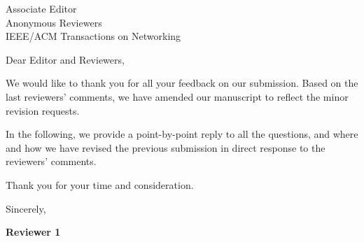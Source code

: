 \documentclass[10pt]{letter}
\date{}
\newcommand{\lettersection}[1]{{\Large {\bfseries #1}}}
\begin{document}

\begin{letter}{Associate Editor\\
Anonymous Reviewers\\
IEEE/ACM Transactions on Networking\\
\vspace{0.2cm}}


\opening{Dear Editor and Reviewers,}
\vspace{0.1cm}


We would like to thank you for all your feedback on our submission. Based on the last reviewers' comments, we have amended our manuscript to reflect the minor revision requests. 

In the following, we provide a point-by-point reply to all the questions, and where and how we have revised the previous submission in direct response to the reviewers’ comments.

Thank you for your time and consideration.

\closing{Sincerely,}

\vspace{1cm}

\end{letter}





\newpage

\vspace{10mm}
\lettersection{Reviewer 1}
\end{document}
